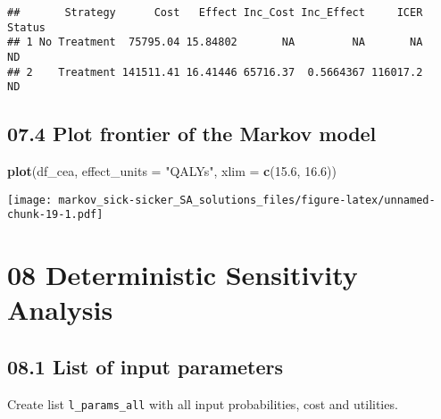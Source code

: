 \documentclass[
]{article}
\newenvironment{Shaded}{\begin{snugshade}}{\end{snugshade}}
\newcommand{\DataTypeTok}[1]{\textcolor[rgb]{0.13,0.29,0.53}{#1}}
\newcommand{\FloatTok}[1]{\textcolor[rgb]{0.00,0.00,0.81}{#1}}
\newcommand{\KeywordTok}[1]{\textcolor[rgb]{0.13,0.29,0.53}{\textbf{#1}}}
\newcommand{\NormalTok}[1]{#1}
\newcommand{\StringTok}[1]{\textcolor[rgb]{0.31,0.60,0.02}{#1}}
\begin{document}
\begin{verbatim}
##       Strategy      Cost   Effect Inc_Cost Inc_Effect     ICER Status
## 1 No Treatment  75795.04 15.84802       NA         NA       NA     ND
## 2    Treatment 141511.41 16.41446 65716.37  0.5664367 116017.2     ND
\end{verbatim}

\hypertarget{plot-frontier-of-the-markov-model}{%
\subsection{07.4 Plot frontier of the Markov
model}\label{plot-frontier-of-the-markov-model}}

\begin{Shaded}
\begin{Highlighting}[]
\KeywordTok{plot}\NormalTok{(df_cea, }\DataTypeTok{effect_units =} \StringTok{"QALYs"}\NormalTok{, }\DataTypeTok{xlim =} \KeywordTok{c}\NormalTok{(}\FloatTok{15.6}\NormalTok{, }\FloatTok{16.6}\NormalTok{))}
\end{Highlighting}
\end{Shaded}

\texttt{[image: markov\_sick-sicker\_SA\_solutions\_files/figure-latex/unnamed-chunk-19-1.pdf]}

\hypertarget{deterministic-sensitivity-analysis}{%
\section{08 Deterministic Sensitivity
Analysis}\label{deterministic-sensitivity-analysis}}

\hypertarget{list-of-input-parameters}{%
\subsection{08.1 List of input
parameters}\label{list-of-input-parameters}}

Create list \texttt{l\_params\_all} with all input probabilities, cost
and utilities.
\end{document}

